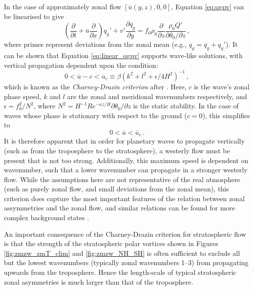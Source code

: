 In the case of approximately zonal flow $[\overline{u}(y,z),0,0]$, Equation
\ref{eq:qgpv} can be linearised to give
\begin{equation}
\left(\frac{\partial}{\partial t} + \overline{u}\frac{\partial}{\partial
    x}\right)q_g' + v'\frac{\partial\overline{q_g}}{\partial y} = f_0\rho_0 \frac{\partial}{\partial z}
\frac{\rho_0Q'}{\partial\theta_{0}/\partial z} \, ,
\label{eq:linear_qgpv} 
\end{equation}
where primes represent deviations from the zonal mean (e.g., $q_g =
\overline{q_g} + q_g'$). It can be shown that Equation \ref{eq:linear_qgpv}
supports wave-like solutions, with vertical propagation dependent upon the
condition:
\begin{equation}
0 < \overline{u}-c < \overline{u}_c \equiv \beta(k^2+l^2+\epsilon/4H^2)^{-1} \,,
\end{equation}
which is known as the \emph{Charney-Drazin criterion} after
\citet{Charney1961}. Here, $c$ is the wave's zonal phase speed, $k$ and $l$ are
the zonal and meridional wavenumbers respectively, and $\epsilon = f_0^2/N^2$,
where $N^2 = H^{-1}Re^{-\kappa z/H}\partial\theta_0/\partial z$ is the static
stability. In the case of waves whose phase is stationary with respect to the
ground ($c=0$), this simplifies to
\begin{equation}
0 < \overline{u} < \overline{u}_c\, . 
\label{eq:charney-drazin}
\end{equation}
It is therefore apparent that in order for planetary waves to propagate
vertically (such as from the troposphere to the stratosphere), a westerly flow
must be present that is not too strong. Additionally, this maximum speed is
dependent on wavenumber, such that a lower wavenumber can propagate in a
stronger westerly flow. While the assumptions here are not representative of the
real atmosphere (such as purely zonal flow, and small deviations from the zonal
mean), this criterion does capture the most important features of the relation
between zonal assymmetries and the zonal flow, and similar relations can be
found for more complex background states \citep{Andrews1987}.

An important consequence of the Charney-Drazin criterion for stratospheric flow
is that the strength of the stratospheric polar vortices shown in Figures
\ref{fig:zmzw_zmT_clim} and \ref{fig:zmzw_NH_SH} is often sufficient to exclude
all but the lowest wavenumbers (typically zonal wavenumbers 1--3) from
propagating upwards from the troposphere. Hence the length-scale of typical
stratospheric zonal asymmetries is much larger than that of the troposphere.

